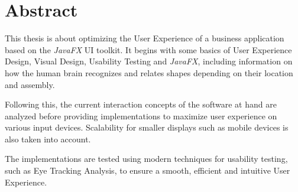 \thispagestyle{empty}
\section*{Abstract}
This thesis is about optimizing the User Experience of a business application based on the \textit{JavaFX} UI toolkit. It begins with some basics of User Experience Design, Visual Design, Usability Testing and \textit{JavaFX}, including information on how the human brain recognizes and relates shapes depending on their location and assembly.\par
Following this, the current interaction concepts of the software at hand are analyzed before providing implementations to maximize user experience on various input devices. Scalability for smaller displays such as mobile devices is also taken into account.\par
The implementations are tested using modern techniques for usability testing, such as Eye Tracking Analysis, to ensure a smooth, efficient and intuitive User Experience.\par
